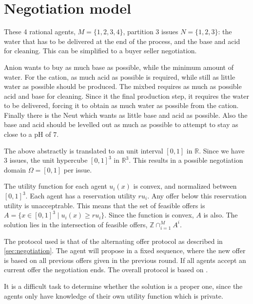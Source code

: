 \section{Negotiation model}
These 4 rational agents, $M = \{1,2,3, 4\}$, partition 3 issues $N=\{1,2,3\}$: the water that has to be delivered at the end of the process, and the base and acid for cleaning.  This can be simplified to a buyer seller negotiation.

Anion wants to buy as much base as possible, while the minimum amount of water. For the cation, as much acid as possible is required, while still as little water as possible should be produced. The mixbed requires as much as possible acid and base for cleaning. Since it the final production step, it requires the water to be delivered, forcing it to obtain as much water as possible from the cation. Finally there is the Neut which wants as little base and acid as possible. Also the base and acid should be levelled out as much as possible to attempt to stay as close to a pH of $7$. 

The above abstractly is translated to an unit interval $[0, 1]$ in $\mathbb{R}$. Since we have $3$ issues, the unit hypercube $[0, 1]^3$ in  $\mathbb{R}^3$. This results in a possible negotiation domain $\Omega = [0,1]$ per issue.

The utility function for each agent $u_i(x)$ is convex, and normalized between $[0, 1]^3$. Each agent has a reservation utility $ru_i$. Any offer below this reservation utility is unacceptrable. This means that the set of feasible offers is $A = \{ x\in [0,1]^3 \mid u_i(x)\geq ru_i\}$. Since the function is convex, $A$ is also. The solution lies in the intersection of feasible offers, $\mathbb{Z} \cap^M_{i=1}A^i$.

The protocol used is that of the alternating offer protocol as described in \cref{sec:negotiation}. The agent will propose in a fixed sequence, where the new offer is based on all previous offers given in the previous round. If all agents accept an current offer the negotiation ends. The overall protocol is based on \citet{zheng2015automated}. 

It is a difficult task to determine whether the solution is a proper one, since the agents only have knowledge of their own utility function which is private. 

